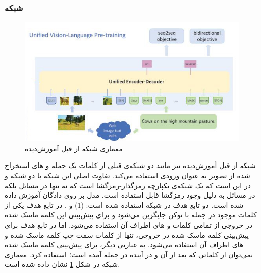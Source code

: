 \subsubsection{شبکه }
	\begin{figure}
		\centerline{\includegraphics[scale=0.7]{images/VLP.JPG}}
		\caption[معماری شبکه از قبل آموزش‌دیده]{معماری شبکه از قبل آموزش‌دیده\cite{zhou2020unified}}
		\label{fig:VLP}
	\end{figure}
	
	شبکه از قبل آموزش‌دیده
	نیز مانند دو شبکه‌ی قبلی از کلمات یک جمله و
	های استخراج شده از تصویر به عنوان ورودی استفاده می‌کند. تفاوت اصلی این شبکه با دو شبکه
	و 
	در این است که یک شبکه‌ی یکپارچه رمزگذار-رمزگشا است که نه تنها در مسائل 
	بلکه در مسائل
	به دلیل وجود رمزگشا قابل استفاده است. مدل 
	بر روی ‌دادگان
	آموزش داده شده است. دو تابع هدف در شبکه
	استفاده شده است: (1) 
	و 
	.
	در تابع هدف
	یکی از کلمات موجود در جمله با توکن 
	\lr{[MASK]}
	جایگزین می‌شود و برای پیش‌بینی این کلمه ماسک شده در خروجی از تمامی کلمات و 
	های اطراف آن استفاده می‌شود. اما در تابع هدف 
	برای پیش‌بینی کلمه ماسک شده در خروجی، تنها از کلمات سمت چپ کلمه ماسک شده و 
	های اطراف آن استفاده می‌شود. به عبارتی دیگر، برای پیش‌بینی کلمه ماسک شده نمی‌توان از کلماتی که بعد از  آن و در آینده در جمله آمده است؛ استفاده کرد. معماری شبکه 
	در شکل 
	\ref{fig:VLP}
	نشان داده شده است.
